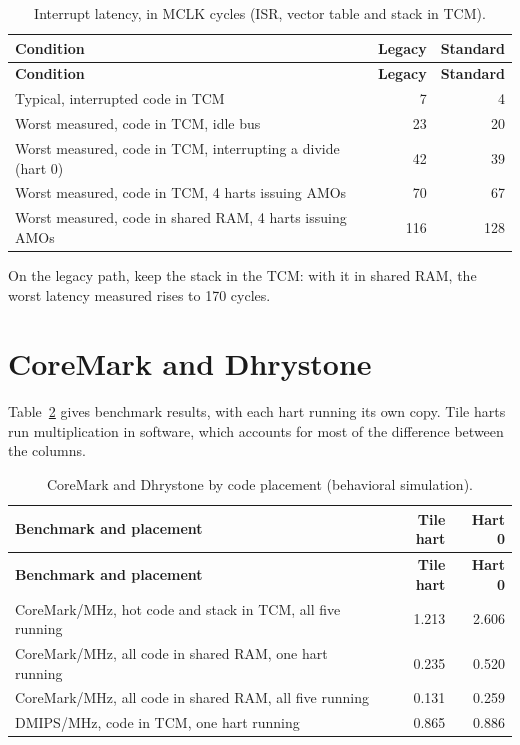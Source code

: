 \documentclass[11pt,pdftex,openany,letterpaper]{report}
\begin{document}
\begin{longtable}[c]{ l r r }
\caption{Interrupt latency, in MCLK cycles (ISR, vector table and stack in TCM).} \label{t:irq-latency} \\
\hline \textbf{Condition} & \textbf{Legacy} & \textbf{Standard} \\ \hline \endfirsthead
\hline \textbf{Condition} & \textbf{Legacy} & \textbf{Standard} \\ \hline \endhead
                               Typical, interrupted code in TCM & 7 & 4 \\
\rowcolor{tablehighlightcolor} Worst measured, code in TCM, idle bus & 23 & 20 \\
                               Worst measured, code in TCM, interrupting a divide (hart 0) & 42 & 39 \\
\rowcolor{tablehighlightcolor} Worst measured, code in TCM, 4 harts issuing AMOs & 70 & 67 \\
                               Worst measured, code in shared RAM, 4 harts issuing AMOs & 116 & 128 \\
\hline
\end{longtable}

On the legacy path, keep the stack in the TCM: with it in shared RAM, the worst latency measured rises to 170 cycles.

\section{CoreMark and Dhrystone} \label{ss:cpi-benchmarks}

Table~\ref{t:cpi-benchmarks} gives benchmark results, with each hart running its own copy. Tile harts run multiplication in software, which accounts for most of the difference between the columns.

\begin{longtable}[c]{ l r r }
\caption{CoreMark and Dhrystone by code placement (behavioral simulation).} \label{t:cpi-benchmarks} \\
\hline \textbf{Benchmark and placement} & \textbf{Tile hart} & \textbf{Hart 0} \\ \hline \endfirsthead
\hline \textbf{Benchmark and placement} & \textbf{Tile hart} & \textbf{Hart 0} \\ \hline \endhead
                               CoreMark/MHz, hot code and stack in TCM, all five running & 1.213 & 2.606 \\
\rowcolor{tablehighlightcolor} CoreMark/MHz, all code in shared RAM, one hart running & 0.235 & 0.520 \\
                               CoreMark/MHz, all code in shared RAM, all five running & 0.131 & 0.259 \\
\rowcolor{tablehighlightcolor} DMIPS/MHz, code in TCM, one hart running & 0.865 & 0.886 \\
\hline
\end{longtable}
\end{document}
